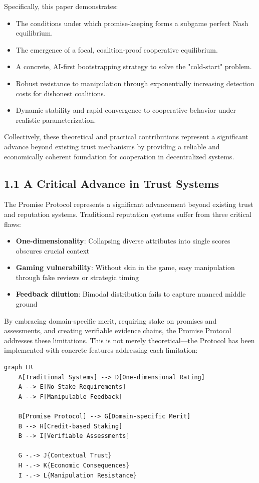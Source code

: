 \documentclass[11pt]{article}
\begin{document}
Specifically, this paper demonstrates:

\begin{itemize}
\item The conditions under which promise-keeping forms a subgame perfect Nash equilibrium.
\item The emergence of a focal, coalition-proof cooperative equilibrium.
\item A concrete, AI-first bootstrapping strategy to solve the "cold-start" problem.
\item Robust resistance to manipulation through exponentially increasing detection costs for dishonest coalitions.
\item Dynamic stability and rapid convergence to cooperative behavior under realistic parameterization.
\end{itemize}

Collectively, these theoretical and practical contributions represent a significant advance beyond existing trust mechanisms by providing a reliable and economically coherent foundation for cooperation in decentralized systems.
\subsection{1.1 A Critical Advance in Trust Systems}
\label{sec:org292516a}
The Promise Protocol represents a significant advancement beyond existing trust and reputation systems. Traditional reputation systems suffer from three critical flaws:

\begin{itemize}
\item \textbf{One-dimensionality}: Collapsing diverse attributes into single scores obscures crucial context
\item \textbf{Gaming vulnerability}: Without skin in the game, easy manipulation through fake reviews or strategic timing
\item \textbf{Feedback dilution}: Bimodal distribution fails to capture nuanced middle ground
\end{itemize}

By embracing domain-specific merit, requiring stake on promises and assessments, and creating verifiable evidence chains, the Promise Protocol addresses these limitations. This is not merely theoretical—the Protocol has been implemented with concrete features addressing each limitation:

\begin{verbatim}
graph LR
    A[Traditional Systems] --> D[One-dimensional Rating]
    A --> E[No Stake Requirements]
    A --> F[Manipulable Feedback]

    B[Promise Protocol] --> G[Domain-specific Merit]
    B --> H[Credit-based Staking]
    B --> I[Verifiable Assessments]

    G -.-> J{Contextual Trust}
    H -.-> K{Economic Consequences}
    I -.-> L{Manipulation Resistance}
\end{verbatim}
\end{document}

